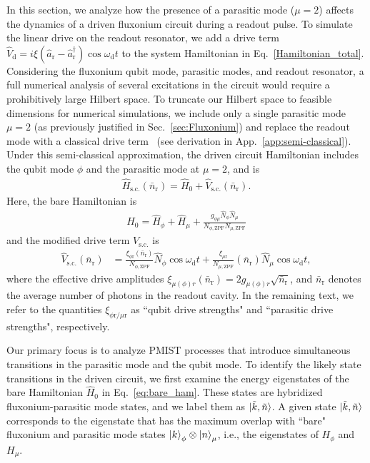 \documentclass[%
reprint,
superscriptaddress,
 amsmath,amssymb,
 aps,
 prx,
longbibliography,
floatfix,
]{revtex4-2}
\begin{document}
In this section, we analyze how the presence of a parasitic mode ($\mu=2$) affects the dynamics of a driven fluxonium circuit during a readout pulse. To simulate the linear drive on the readout resonator, we add a drive term $\hat{V}_\textrm{d}=i\xi (\hat a_\textrm{r}-\hat a_\textrm{r}^\dagger)\cos{\omega_\textrm{d} t}$ to the system Hamiltonian in Eq.~\ref{Hamiltonian_total}. Considering the fluxonium qubit mode, parasitic modes, and readout resonator, a full numerical analysis of several excitations in the circuit would require a prohibitively large Hilbert space. To truncate our Hilbert space to feasible dimensions for numerical simulations, we include only a single parasitic mode $\mu=2$ (as previously justified in Sec.~\ref{sec:Fluxonium}) and replace the readout mode with a classical drive term~\cite{cohen2023reminiscence,dumas2024unified,xiao2023diagrammatic} (see derivation in App.~\ref{app:semi-classical}). Under this semi-classical approximation, the driven circuit Hamiltonian includes the qubit mode $\phi$ and the parasitic mode at $\mu=2$, and is
\begin{align}
  \hat H_\textrm{s.c.}(\bar n_\textrm{r})=\hat H_0+\hat V_\textrm{s.c.}(\bar n_\textrm{r}).  \label{eq:drive_Ham}
\end{align}
Here, the bare Hamiltonian is
\begin{align}
\hat H_0=\hat H_\phi+\hat H_{\mu}+\frac{g_{\phi\mu}\hat N_\phi \hat N_\mu }{N_{\phi,\mathrm{ZPF}}N_{\mu,\mathrm{ZPF}}} \label{eq:bare_ham} 
\end{align}
and the modified drive term $V_\textrm{s.c.}$ is
\begin{align}
    \hat V_\textrm{s.c.}(\bar n_\textrm{r})&=\frac{\xi_{\phi \textrm{r}}(\bar n_\textrm{r})}{N_{\phi,\mathrm{ZPF}}} \hat N_\phi\cos{\omega_\textrm{d} t}+\frac{\xi_{\mu \textrm{r}}}{N_{\mu, \mathrm{ZPF}}}(\bar n_\textrm{r}) \hat N_\mu\cos{\omega_\textrm{d} t}\label{eq:drive},
\end{align}
where the effective drive amplitudes $\xi_{\mu(\phi) r}(\bar n_\textrm{r})=2g_{\mu(\phi) r}\sqrt{\bar n_\textrm{r}}$, and $\bar n_\textrm{r}$ denotes the average number of photons in the readout cavity. In the remaining text, we refer to the quantities $\xi_{\phi \textrm{r}/\mu \textrm{r}}$ as ``qubit drive strengths" and ``parasitic drive strengths", respectively.

Our primary focus is to analyze PMIST processes that introduce simultaneous transitions in the parasitic mode and the qubit mode. To identify the likely state transitions in the driven circuit, we first examine the energy eigenstates of the bare Hamiltonian $\hat{H}_0$ in Eq.~\ref{eq:bare_ham}. These states are hybridized fluxonium-parasitic mode states, and we label them as $\ket{\tilde{k}, \tilde{n}}$. A given state $\ket{\tilde{k}, \tilde{n}}$ corresponds to the eigenstate that has the maximum overlap with ``bare" fluxonium and parasitic mode states $\ket{k}_\phi\otimes\ket{n}_\mu$, i.e., the eigenstates of $H_{\phi}$ and $H_{\mu}$.
\end{document}
